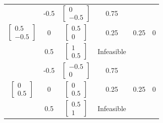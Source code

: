 \documentclass[14pt, a4paper]{extarticle}
\begin{document}
\begin{latin}
\begin{longtable}{|c|c|c|c|c|c|}
			& -0.5 &$\begin{bmatrix} 0 \\ -0.5 \end{bmatrix}$      &      0.75     &        &         \\ \cline{2-4}
		\multirow{-3}{*}{$\begin{bmatrix} 0.5 \\ -0.5 \end{bmatrix}$}& 0   &$\begin{bmatrix} 0.5 \\ 0 \end{bmatrix}$      &       0.25                 &      0.25       &  0  \\ \cline{2-4}
			& 0.5  &$\begin{bmatrix} 1 \\ 0.5 \end{bmatrix}$      & Infeasible                        &   &                \\	\cline{2-4} \hline
		
			&            -0.5            &$\begin{bmatrix} -0.5 \\ 0 \end{bmatrix}$      &     0.75             &         &         \\  \cline{2-4} 
		\multirow{-3}{*}{$\begin{bmatrix} 0 \\ 0.5 \end{bmatrix}$}&        0                &$\begin{bmatrix} 0 \\ 0.5 \end{bmatrix}$      &      0.25                  &  0.25            &  0  \\  \cline{2-4} 
			&           0.5             &$\begin{bmatrix} 0.5 \\ 1 \end{bmatrix}$      & Infeasible                        &          &  \\  \cline{2-4} \hline
		

\end{longtable}
\end{latin}
\end{document}

